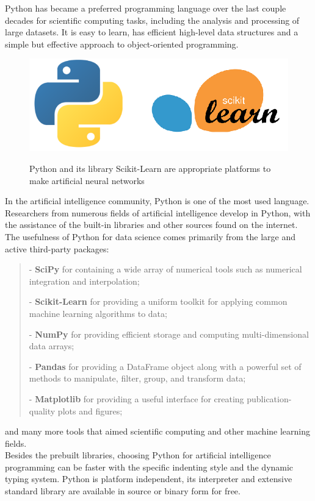Python has became a preferred programming language over the last couple decades for scientific computing tasks, including the analysis and processing of large datasets. It is easy to learn, has efficient high-level data structures and a simple but effective approach to object-oriented programming.

\begin{figure}[h]
	\centering
	\caption{Python and its library Scikit-Learn are appropriate platforms to make artificial neural networks}
	\includegraphics[height=0.25\linewidth]{./figures/python_scikit}
	\label{fig:python_scikit}
\end{figure}

In the artificial intelligence community, Python is one of the most used language. Researchers from numerous fields of artificial intelligence  develop in Python, with the assistance of the built-in libraries and other sources found on the internet. The usefulness of Python for data science comes primarily from the large and active third-party packages: 
\begin{verse}
	- \textbf{SciPy} for containing a wide array of numerical tools such as numerical integration and interpolation;
	
	- \textbf{Scikit-Learn} for providing a uniform toolkit for applying common machine learning algorithms to data;
	
	- \textbf{NumPy} for providing efficient storage and computing multi-dimensional data arrays;
	
	-  \textbf{Pandas} for providing a DataFrame object along with a powerful set of methods to manipulate, filter, group, and transform data; 
	
	- \textbf{Matplotlib} for providing a useful interface for creating publication-quality plots and figures;
\end{verse} 
and many more tools that aimed scientific computing and other machine learning fields.\\ 
Besides the prebuilt libraries, choosing Python for artificial intelligence programming can be faster with the specific indenting style and the dynamic typing system. Python is platform independent, its interpreter and extensive standard library are available in source or binary form for free.